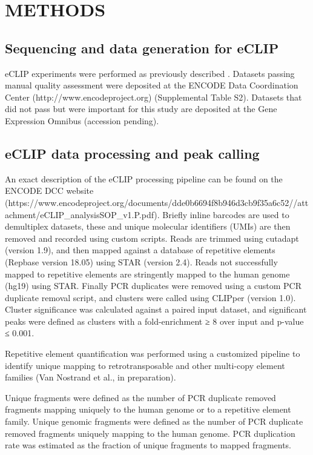 \section{METHODS}

\subsection{Sequencing and data generation for eCLIP}
eCLIP experiments were performed as previously described \cite{VanNostrand2016}. Datasets passing manual quality assessment were deposited at the ENCODE Data Coordination Center (http://www.encodeproject.org) (Supplemental Table S2). Datasets that did not pass but were important for this study are deposited at the Gene Expression Omnibus (accession pending).

\subsection{eCLIP data processing and peak calling}
An exact description of the eCLIP processing pipeline can be found on the ENCODE DCC website (https://www.encodeproject.org/documents/dde0b669\-4f8b\-946d\-3cb9f35a6c52/\@\@download/attachment/eCLIP\_analysisSOP\_v1.P.pdf). Briefly inline barcodes are used to demultiplex datasets, these and unique molecular identifiers (UMIs) are then removed and recorded using custom scripts. Reads are trimmed using cutadapt (version 1.9), and then mapped against a database of repetitive elements (Repbase version 18.05) using STAR (version 2.4). Reads not successfully mapped to repetitive elements are stringently mapped to the human genome (hg19) using STAR. Finally PCR duplicates were removed using a custom PCR duplicate removal script, and clusters were called using CLIPper (version 1.0). Cluster significance was calculated against a paired input dataset, and significant peaks were defined as clusters with a fold-enrichment ≥ 8 over input and p-value ≤ 0.001.

Repetitive element quantification was performed using a customized pipeline to identify unique mapping to retrotransposable and other multi-copy element families (Van Nostrand et al., in preparation).

Unique fragments were defined as the number of PCR duplicate removed fragments mapping uniquely to the human genome or to a repetitive element family. Unique genomic fragments were defined as the number of PCR duplicate removed fragments uniquely mapping to the human genome. PCR duplication rate was estimated as the fraction of unique fragments to mapped fragments.

